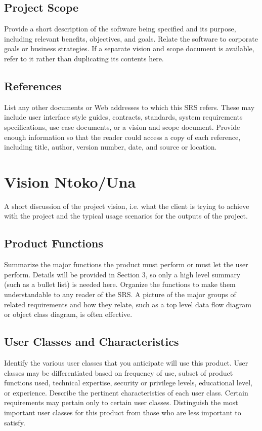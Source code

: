 \documentclass{scrreprt}
\begin{document}
\section{Project Scope}
Provide a short description of the software being specified and its purpose, 
including relevant benefits, objectives, and goals. Relate the software to 
corporate goals or business strategies. If a separate vision and scope document 
is available, refer to it rather than duplicating its contents here.

\section{References}
List any other documents or Web addresses to which this SRS refers. These may 
include user interface style guides, contracts, standards, system requirements 
specifications, use case documents, or a vision and scope document. Provide 
enough information so that the reader could access a copy of each reference, 
including title, author, version number, date, and source or location.


\chapter{Vision Ntoko/Una}

A short discussion of the project vision, i.e. what the client is trying to achieve with the project and the typical usage scenarios for the outputs of the project.

\section{Product Functions}
Summarize the major functions the product must perform or must let the user 
perform. Details will be provided in Section 3, so only a high level summary 
(such as a bullet list) is needed here. Organize the functions to make them 
understandable to any reader of the SRS. A picture of the major groups of 
related requirements and how they relate, such as a top level data flow diagram 
or object class diagram, is often effective.

\section{User Classes and Characteristics}
Identify the various user classes that you anticipate will use this product.  
User classes may be differentiated based on frequency of use, subset of product 
functions used, technical expertise, security or privilege levels, educational 
level, or experience. Describe the pertinent characteristics of each user class.  
Certain requirements may pertain only to certain user classes. Distinguish the 
most important user classes for this product from those who are less important 
to satisfy.
\end{document}
